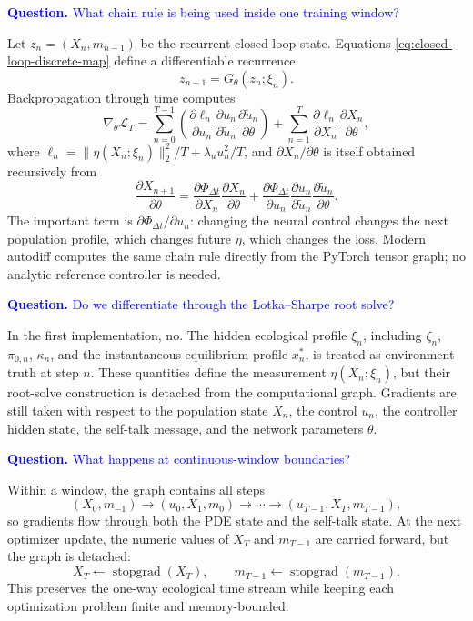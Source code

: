 \documentclass[11pt]{article}
\newcommand{\bluequestion}[1]{\textcolor{blue}{\textbf{Question.} #1}}
\begin{document}
\bluequestion{What chain rule is being used inside one training window?}

Let \(z_n=(X_n,m_{n-1})\) be the recurrent closed-loop state. Equations
\eqref{eq:closed-loop-discrete-map} define a differentiable recurrence
\[
  z_{n+1}=G_\theta(z_n;\xi_n).
\]
Backpropagation through time computes
\begin{equation}
  \nabla_\theta \mathcal L_T
  =
  \sum_{n=0}^{T-1}
  \left(
    \frac{\partial \ell_n}{\partial u_n}
    \frac{\partial u_n}{\partial \tilde u_n}
    \frac{\partial \tilde u_n}{\partial \theta}
  \right)
  +
  \sum_{n=1}^{T}
  \frac{\partial \ell_n}{\partial X_n}
  \frac{\partial X_n}{\partial \theta},
  \label{eq:bptt-gradient}
\end{equation}
where \(\ell_n=\|\eta(X_n;\xi_n)\|_2^2/T+\lambda_u u_n^2/T\), and
\(\partial X_n/\partial\theta\) is itself obtained recursively from
\[
  \frac{\partial X_{n+1}}{\partial\theta}
  =
  \frac{\partial \Phi_{\Delta t}}{\partial X_n}
  \frac{\partial X_n}{\partial\theta}
  +
  \frac{\partial \Phi_{\Delta t}}{\partial u_n}
  \frac{\partial u_n}{\partial\tilde u_n}
  \frac{\partial \tilde u_n}{\partial\theta}.
\]
The important term is
\(\partial \Phi_{\Delta t}/\partial u_n\): changing the neural control
changes the next population profile, which changes future \(\eta\), which
changes the loss. Modern autodiff computes the same chain rule directly
from the PyTorch tensor graph; no analytic reference controller is needed.

\bluequestion{Do we differentiate through the Lotka--Sharpe root solve?}

In the first implementation, no. The hidden ecological profile
\(\xi_n\), including \(\zeta_n\), \(\pi_{0,n}\), \(\kappa_n\), and the
instantaneous equilibrium profile \(x_n^*\), is treated as environment
truth at step \(n\). These quantities define the measurement
\(\eta(X_n;\xi_n)\), but their root-solve construction is detached from
the computational graph. Gradients are still taken with respect to the
population state \(X_n\), the control \(u_n\), the controller hidden state,
the self-talk message, and the network parameters \(\theta\).

\bluequestion{What happens at continuous-window boundaries?}

Within a window, the graph contains all steps
\[
  (X_0,m_{-1})
  \to
  (u_0,X_1,m_0)
  \to
  \cdots
  \to
  (u_{T-1},X_T,m_{T-1}),
\]
so gradients flow through both the PDE state and the self-talk state. At
the next optimizer update, the numeric values of \(X_T\) and \(m_{T-1}\)
are carried forward, but the graph is detached:
\[
  X_T\leftarrow \operatorname{stopgrad}(X_T),
  \qquad
  m_{T-1}\leftarrow \operatorname{stopgrad}(m_{T-1}).
\]
This preserves the one-way ecological time stream while keeping each
optimization problem finite and memory-bounded.
\end{document}
